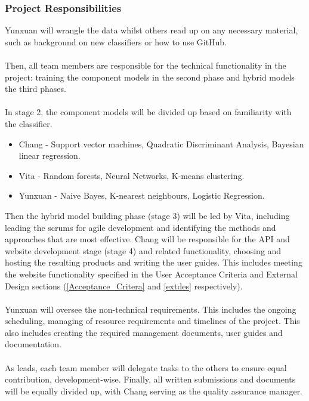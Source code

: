 \documentclass[a4paper, 12pt]{article}
\begin{document}
        \subsubsection{Project Responsibilities} \label{model_respon}
        Yunxuan will wrangle the data whilst others read up on any necessary material, such as background on new classifiers or how to use GitHub.
        \\\\
        Then, all team members are responsible for the technical functionality in the project: training the component models in the second phase and hybrid models the third phases. 
        \\\\
        In stage 2, the component models will be divided up based on familiarity with the classifier.
        \begin{itemize}
            \item Chang - Support vector machines, Quadratic Discriminant Analysis, Bayesian linear regression. 
            \item Vita - Random forests, Neural Networks, K-means clustering.
            \item Yunxuan - Naive Bayes, K-nearest neighbours, Logistic Regression.
        \end{itemize}
        
        Then the hybrid model building phase (stage 3) will be led by Vita, including leading the scrums for agile development and identifying the methods and approaches that are most effective. Chang will be responsible for the API and website development stage (stage 4) and related functionality, choosing and hosting the resulting products and writing the user guides. This includes meeting the website functionality specified in the User Acceptance Criteria and External Design sections (\ref{Acceptance_Critera} and \ref{extdes} respectively).
        \\\\
        Yunxuan will oversee the non-technical requirements. This includes the ongoing scheduling, managing of resource requirements and timelines of the project. This also includes creating the required management documents, user guides and documentation. 
        \\\\
        As leads, each team member will delegate tasks to the others to ensure equal contribution, development-wise. Finally, all written submissions and documents will be equally divided up, with Chang serving as the quality assurance manager.
        
\end{document}
